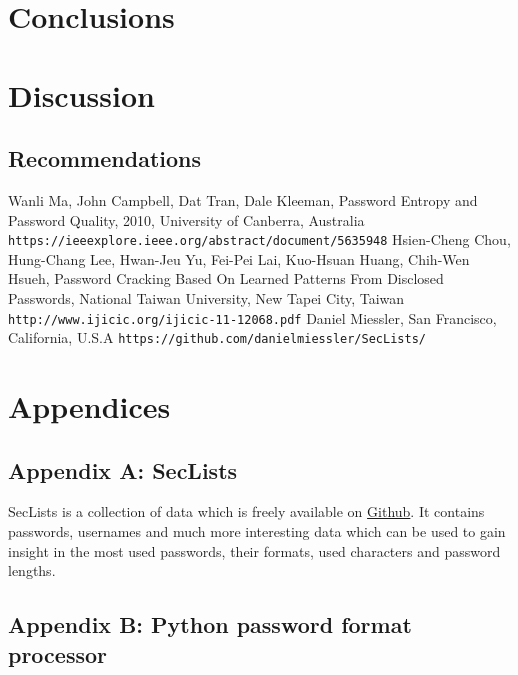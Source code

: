 \documentclass[a4paper,12pt]{article}
\begin{document}
\newpage
\section{Conclusions}

\newpage
\section{Discussion}

\newpage
\subsection{Recommendations}

\newpage
\begin{thebibliography}{9}
   Wanli Ma, John Campbell, Dat Tran, Dale Kleeman, Password Entropy and Password Quality, 2010, University of Canberra, Australia \texttt{https://ieeexplore.ieee.org/abstract/document/5635948}
   Hsien-Cheng Chou, Hung-Chang Lee, Hwan-Jeu Yu, Fei-Pei Lai, Kuo-Hsuan Huang, Chih-Wen Hsueh, Password Cracking Based On Learned Patterns From Disclosed Passwords, National Taiwan University, New Tapei City, Taiwan \texttt{http://www.ijicic.org/ijicic-11-12068.pdf}
   Daniel Miessler, San Francisco, California, U.S.A \texttt{https://github.com/danielmiessler/SecLists/}
\end{thebibliography}

\newpage
\section{Appendices}

\subsection{Appendix A: SecLists}
\label{app:secl}

SecLists is a collection of data which is freely available on \href{https://github.com/danielmiessler/SecLists/}{Github}. It contains passwords, usernames and much more interesting data which can be used to gain insight in the most used passwords, their formats, used characters and password lengths.

\subsection{Appendix B: Python password format processor}
\label{app:pyprocc}
\end{document}
